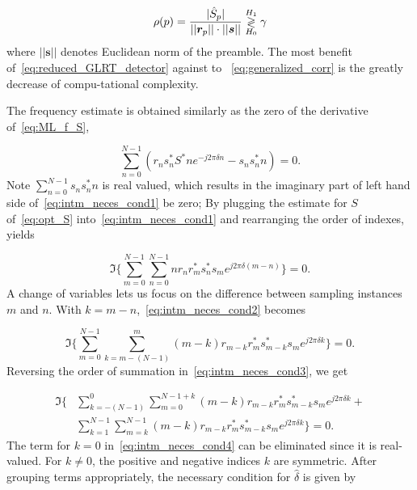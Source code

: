 \begin{equation}
  \label{eq:reduced_GLRT_detector}
  \rho(p)=
  \frac{|\hat{S}_p|}
  {||\bm{r}_{p}||\cdot||\bm{s}||} \mathrel{\mathop\gtrless\limits^{H_1}_{H_0}} \gamma
\end{equation}
where $||\bm{s}||$ denotes Euclidean norm of the preamble. The most benefit of~\eqref{eq:reduced_GLRT_detector} against to
~\eqref{eq:generalized_corr} is the greatly decrease of compu-tational complexity.

The frequency estimate is obtained similarly as the zero of the
derivative of~\eqref{eq:ML_f_S},

\begin{equation}
    \label{eq:intm_neces_cond1}
    \sum_{n=0}^{N-1}{(r_{n}s_n^{*}S^{*}ne^{-j2\pi \delta n}-s_ns_n^{*}n)=0}.
    \end{equation}
Note $\sum_{n=0}^{N-1}{s_ns_n^{*}n}$ is real
valued, which results in the imaginary part of left hand side of~\eqref{eq:intm_neces_cond1} be zero;
By plugging the estimate for $S$ of~\eqref{eq:opt_S} into~\eqref{eq:intm_neces_cond1} and rearranging the order of indexes, yields

\begin{equation}
    \label{eq:intm_neces_cond2}
    \Im\bigg\{\sum_{m=0}^{N-1}{\sum_{n=0}^{N-1}{nr_{n}r_{m}^{*}s_n^{*}s_me^{j2\pi \delta(m-n)}}}\bigg\} = 0.
  \end{equation}
A change of variables lets us focus on the difference between sampling instances $m$ and $n$.
With $k=m-n$,~\eqref{eq:intm_neces_cond2} becomes

\begin{equation}
    \label{eq:intm_neces_cond3}
    \Im\bigg\{\sum_{m=0}^{N-1}{\sum_{k{=}m-(N-1)}^{m}{(m{-}k)r_{m-k}r_{m}^{*}s_{m-k}^{*}s_me^{j2\pi \delta k}}}\bigg\}=0.
  \end{equation}
Reversing the order of summation in~\eqref{eq:intm_neces_cond3}, we get

\begin{equation}
    \begin{aligned}
    \label{eq:intm_neces_cond4}
    \Im\bigg\{&\sum_{k=-(N-1)}^{0}\sum_{m=0}^{N-1+k}{(m{-}k)r_{m-k}r_{m}^{*}s_{m-k}^{*}s_me^{j2\pi \delta k}+}\\
    &\sum_{k=1}^{N-1}\sum_{m=k}^{N-1}{(m{-}k)r_{m-k}r_{m}^{*}s_{m-k}^{*}s_me^{j2\pi \delta k}}\bigg\}= 0.
    \end{aligned}
  \end{equation}
The term for $k{=}0$ in~\eqref{eq:intm_neces_cond4} can be eliminated since it is real-valued. For $k \neq 0$, the positive and negative indices $k$ are symmetric. 
After grouping terms appropriately, the necessary condition for $\hat{\delta}$ is given by

